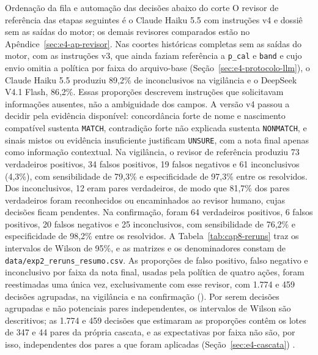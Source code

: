 \begin{chapter}{Ordenação da fila e automação das decisões abaixo do corte}
O revisor de referência das etapas seguintes é o Claude Haiku 5.5 com instruções v4 e dossiê sem as saídas do motor; os demais revisores comparados estão no Apêndice~\ref{sec:e4-ap-revisor}. Nas coortes históricas completas sem as saídas do motor, com as instruções v3, que ainda faziam referência a \texttt{p\_cal} e \texttt{band} e cujo envio omitia a política por faixa do arquivo-base (Seção~\ref{sec:e4-protocolo-llm}), o Claude Haiku 5.5 produziu 89,2\% de inconclusivos na vigilância e o DeepSeek V4.1 Flash, 86,2\%. Essas proporções descrevem instruções que solicitavam informações ausentes, não a ambiguidade dos campos. A versão v4 passou a decidir pela evidência disponível: concordância forte de nome e nascimento compatível sustenta \texttt{MATCH}, contradição forte não explicada sustenta \texttt{NONMATCH}, e sinais mistos ou evidência insuficiente justificam \texttt{UNSURE}, com a nota final apenas como informação contextual. Na vigilância, o revisor de referência produziu 73 verdadeiros positivos, 34 falsos positivos, 19 falsos negativos e 61 inconclusivos (4,3\%), com sensibilidade de 79,3\% e especificidade de 97,3\% entre os resolvidos. Dos inconclusivos, 12 eram pares verdadeiros, de modo que 81,7\% dos pares verdadeiros foram reconhecidos ou encaminhados ao revisor humano, cujas decisões ficam pendentes. Na confirmação, foram 64 verdadeiros positivos, 6 falsos positivos, 20 falsos negativos e 25 inconclusivos, com sensibilidade de 76,2\% e especificidade de 98,2\% entre os resolvidos. A Tabela~\ref{tab:cap8-reruns} traz os intervalos de Wilson de 95\%, e as matrizes e os denominadores constam de \texttt{data/exp2\_reruns\_resumo.csv}. As proporções de falso positivo, falso negativo e inconclusivo por faixa da nota final, usadas pela política de quatro ações, foram reestimadas uma única vez, exclusivamente com esse revisor, com 1.774 e 459 decisões agrupadas, na vigilância e na confirmação (). Por serem decisões agrupadas e não potenciais pares independentes, os intervalos de Wilson são descritivos; as 1.774 e 459 decisões que estimaram as proporções contêm os lotes de 347 e 44 pares da própria cascata, e as expectativas por faixa não são, por isso, independentes dos pares a que foram aplicadas (Seção~\ref{sec:e4-cascata}) \cite{Jardim2026phdrepo}.


\end{chapter}
